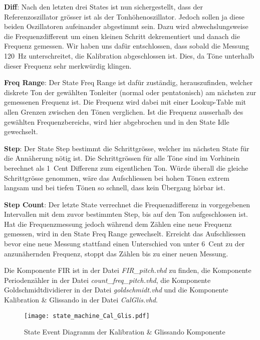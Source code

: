 \textbf{Diff}:
Nach den letzten drei States ist nun sichergestellt, dass der Referenzoszillator grösser ist als der Tonhöhenoszillator. Jedoch sollen ja diese beiden Oszillatoren aufeinander abgestimmt sein. Dazu wird abwechslungsweise die Frequenzdifferent um einen kleinen Schritt dekrementiert und danach die Frequenz gemessen. Wir haben uns dafür entschlossen, dass sobald die Messung \SI{120}{Hz} unterschreitet, die Kalibration abgeschlossen ist. Dies, da Töne unterhalb dieser Frequenz sehr merkwürdig klingen.

\textbf{Freq Range}:
Der State Freq Range ist dafür zuständig, herauszufinden, welcher diskrete Ton der gewählten Tonleiter (normal oder pentatonisch) am nächsten zur gemessenen Frequenz ist. Die Frequenz wird dabei mit einer Lookup-Table mit allen Grenzen zwischen den Tönen verglichen. Ist die Frequenz ausserhalb des gewählten Frequenzbereichs, wird hier abgebrochen und in den State Idle gewechselt.

\textbf{Step}:
Der State Step bestimmt die Schrittgrösse, welcher im nächsten State für die Annäherung nötig ist. Die Schrittgrössen für alle Töne sind im Vorhinein berechnet als \SI{1}{Cent} Differenz zum eigentlichen Ton. Würde überall die gleiche Schrittgrösse genommen, wäre das Aufschliessen bei hohen Tönen extrem langsam und bei tiefen Tönen so schnell, dass kein Übergang hörbar ist. 

\textbf{Step Count}:
Der letzte State verrechnet die Frequenzdifferenz in vorgegebenen Intervallen mit dem zuvor bestimmten Step, bis auf den Ton aufgeschlossen ist. Hat die Frequenzmessung jedoch während dem Zählen eine neue Frequenz gemessen, wird in den State Freq Range gewechselt. Erreicht das Aufschliessen bevor eine neue Messung stattfand einen Unterschied von unter \SI{6}{Cent} zu der anzunähernden Frequenz, stoppt das Zählen bis zu einer neuen Messung.


Die Komponente FIR ist in der Datei \textit{FIR\_pitch.vhd} zu finden, die Komponente Periodenzähler in der Datei \textit{count\_freq\_pitch.vhd}, die Komponente Goldschmidtdividierer in der Datei \textit{goldschmidt.vhd} und die Komponente Kalibration \& Glissando in der Datei \textit{CalGlis.vhd}.

\begin{figure}[h!]
	\centering
	\texttt{[image: state\_machine\_Cal\_Glis.pdf]}
	\caption{State Event Diagramm der Kalibration \& Glissando Komponente} 
	\label{img:state_event_Cal_Glis}
\end{figure} 

